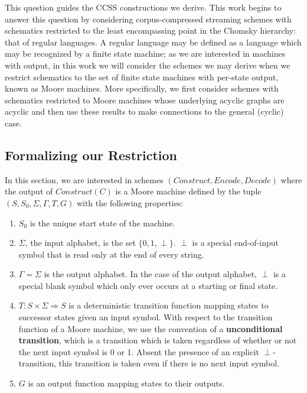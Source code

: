 \documentclass{article}
\theoremstyle{definition}
\begin{document}
This question guides the CCSS constructions we derive.  This work 
begins to answer this question by considering corpus-compressed streaming schemes with schematics restricted 
to the least encompassing point in the Chomsky hierarchy:  that of regular languages.
A regular language may be defined as a language which may be recognized by a finite state 
machine; as we are interested in machines with output, in this work we will consider the schemes
we may derive when we restrict schematics to the set of finite state machines with per-state output,
known as Moore machines.  More specifically, we first consider schemes with schematics restricted to 
Moore machines whose underlying acyclic graphs are acyclic and then use these results to make connections 
to the general (cyclic) case.

\subsection{Formalizing our Restriction}

In this section, we are interested in schemes $(Construct, Encode, Decode)$ where 
the output of $Construct(C)$ is a Moore machine defined by the tuple 
$(S,S_0,\Sigma,\Gamma,T,G)$ with the following properties:

\begin{enumerate}
\item{$S_0$ is the unique start state of the machine.}
\item{$\Sigma$, the input alphabet, is the set $\{0,1,\perp\}$.  
$\perp$ is a special end-of-input symbol that is read only at the end of every string.}
\item{$\Gamma = \Sigma$ is the output alphabet.  
In the case of the output alphabet, $\perp$ is a special 
blank symbol which only ever occurs at a starting or final state.}
\item{$T:S\times \Sigma \Rightarrow S$ is a deterministic transition function mapping 
states to successor states given an input symbol.  With respect to 
the transition function of a Moore machine, we use the convention of a 
\textbf{unconditional transition}, which is a transition which is taken 
regardless of whether or not the next input symbol is 0 or 1.  Absent the 
presence of an explicit $\perp$-transition, this transition is taken 
even if there is no next input symbol.}
\item{$G$ is an output function mapping states to their outputs.}
\end{enumerate}
\end{document}
